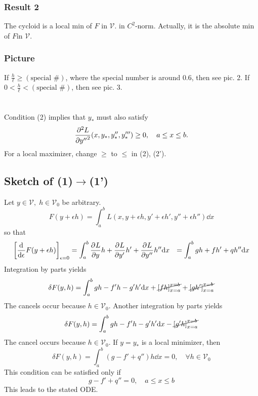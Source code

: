 \documentclass[12pt,twoside]{article}
\begin{document}
\subsubsection{Result 2}
The cycloid is a local min of $F$ in $\mathcal{V}$. in $C^2$-norm. Actually, it
is the absolute min of $F$in $\mathcal{V}$.
\subsubsection{Picture}
If $\frac{h}{\ell}\ge (\text{special \#})$, where the special number is around
$0.6$, then see pic. 2. If $0<\frac{h}{\ell}<(\text{special \#})$, then see
pic. 3.


\section{\todo{}}
\section{\todo{}}
\section{\todo{}}
\todo{}
Condition (2) implies that $y_*$ must also satisfy
$$\pd[2]{L}{y''}(x,y_*,y_*'',y_*''')\ge0,\quad a\le x\le b.$$
For a local maximizer, change $\ge$ to $\le$ in (2), (2').
\subsection{Sketch of (1)$\rightarrow$(1')}
Let $y\in\mathcal{V},\;h\in\mathcal{V}_0$ be arbitrary.
\begin{equation*}
  F(y+\epsilon h) = \int_a^b L(x,y+\epsilon h, y'+\epsilon h', y''+\epsilon h'')\dd{x}
\end{equation*}
so that
\begin{equation*}
  \begin{aligned}
    {\left[ \od{}{\epsilon}F(y+\epsilon h) \right]}_{\epsilon=0} &=
    \int_a^b\pd{L}{y}h + \pd{L}{y'}h' + \pd{L}{y''}h''\dd{x}
    &= \int_a^b gh + fh' + qh''\dd{x}
  \end{aligned}
\end{equation*}
Integration by parts yields
\begin{equation*}
    \delta F(y,h) = \int_a^b gh-f'h-g'h' \dd{x} + \cancel{{\left[ fh \right]}_{x=a}^{x=b}} + \cancel{{\left[ gh' \right]}_{x=a}^{x=b}}
\end{equation*}
The cancels occur because $h\in\mathcal{V}_0$. Another integration by parts
yields
\begin{equation*}
  \delta F(y,h) = \int_a^b gh-f'h-g'h' \dd{x} - \cancel{{[g'h]}_{x=a}^{x=b}}
\end{equation*}
The cancel occurs because $h\in\mathcal{V}_0$. If $y=y_*$ is a local minimizer,
then
\begin{equation*}
  \delta F(y,h) = \int_a^b(g-f'+q'')h\dd{x} = 0,\quad \forall h\in\mathcal{V}_0
\end{equation*}
This condition can be satisfied only if
\begin{equation*}
  g - f' + q'' =0,\quad a\le x \le b
\end{equation*}
This leads to the stated ODE.
\end{document}
